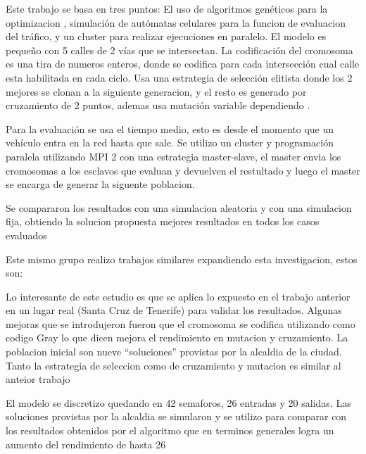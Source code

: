 \begin{itemize}
	\begin{item}
		
		Este trabajo se basa en tres puntos: El uso de algoritmos genéticos para la optimizacion , simulación de autómatas celulares para la funcion de evaluacion del tráfico, y un cluster para realizar ejecuciones en paralelo.
		El modelo es pequeño con 5 calles de 2 vías que se intersectan.
		La codificación del cromosoma es una tira de numeros enteros, donde se codifica para cada intersección cual calle esta habilitada en cada ciclo.
		Usa una estrategia de selección elitista donde los 2 mejores se clonan a la siguiente generacion, y el resto es generado por cruzamiento de 2 puntos, ademas usa mutación variable dependiendo .
		
		Para la evaluación se usa el tiempo medio, esto es desde el momento que un vehículo entra en la red hasta que sale. Se utilizo un cluster y programación paralela utilizando MPI 2 con una estrategia master-slave, el master envia los cromosomas a los esclavos que evaluan y devuelven el restultado y luego el master se encarga de generar la siguente poblacion.
		
		Se compararon los resultados con una simulacion aleatoria y con una simulacion fija, obtiendo la solucion propuesta mejores resultados en todos los casos evaluados
		
		Este mismo grupo realizo trabajos similares expandiendo esta investigacion, estos son:
	\end{item}

	\begin{item}
		\bibentry{Sanchez2008}
Lo interesante de este estudio es que se aplica lo expuesto en el trabajo anterior en un lugar real (Santa Cruz de Tenerife) para validar los resultados.
Algunas mejoras que se introdujeron fueron que el cromosoma se codifica utilizando como codigo Gray lo que dicen mejora el rendimiento en mutacion y cruzamiento. La poblacion inicial son nueve “soluciones” provistas por la alcaldia de la ciudad. Tanto la estrategia de seleccion como de cruzamiento y mutacion  es similar al anteior trabajo

El modelo se discretizo quedando en 42 semaforos, 26 entradas y 20 salidas.
Las soluciones provistas por la alcaldia se simularon y se utilizo para comparar con los resultados obtenidos por el algoritmo que en terminos generales logra un aumento del rendimiento de hasta 26%

	\end{item}


\end{itemize}
